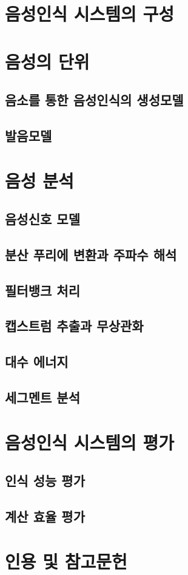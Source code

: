 \documentclass[../main.tex]{subfiles}
\begin{document}
\section{음성인식 시스템의 구성}
\section{음성의 단위}
\subsection{음소를 통한 음성인식의 생성모델}
\subsection{발음모델}\label{subsec:pronunciation-model}

\section{음성 분석}
\subsection{음성신호 모델}
\subsection{분산 푸리에 변환과 주파수 해석}
\subsection{필터뱅크 처리}
\subsection{캡스트럼 추출과 무상관화}
\subsection{대수 에너지}
\subsection{세그멘트 분석}

\section{음성인식 시스템의 평가}
\subsection{인식 성능 평가}
\subsection{계산 효율 평가}

\section*{인용 및 참고문헌}
\end{document}
